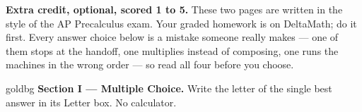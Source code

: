 \documentclass[10pt]{article}
\begin{document}

\vspace{0.12in}

\boxguard[8]
\begin{remindbox}
\small
\textbf{Extra credit, optional, scored 1 to 5.} These two pages are written in the style of the AP
Precalculus exam. Your graded homework is on DeltaMath; do it first. Every
answer choice below is a mistake someone really makes --- one of them stops at the handoff,
one multiplies instead of composing, one runs the machines in the wrong order --- so read all
four before you choose.
\end{remindbox}

\vspace{0.12in}

\begin{headlinebox}{goldbg}
\small
\textbf{Section I --- Multiple Choice.} Write the letter of the single best answer in its Letter box. No calculator.
\end{headlinebox}

\vspace{0.06in}
\end{document}
